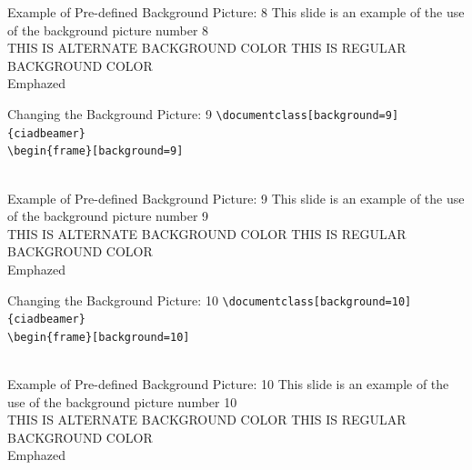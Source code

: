 \documentclass[english,sectioncirclenumberstyle]{ciadbeamer}
\begin{document}
\begin{frame}[background=8]{Example of Pre-defined Background Picture: 8}
	This slide is an example of the use of the background picture number 8 \\[.5cm]
	\ifbeamerthemeciadalternatebgcolor%
		THIS IS ALTERNATE BACKGROUND COLOR%
	\else%
		THIS IS REGULAR BACKGROUND COLOR%
	\fi\\[.5cm]%
	Emphazed 
\end{frame}

\begin{frame}[t]{{Changing the Background Picture:} 9}
	\texttt{{\textbackslash}documentclass[background=9]\{ciadbeamer\}} \\[.25cm]
	\texttt{{\textbackslash}begin\{frame\}[background=9]} \\[.25cm]
	\centering{} \\[.25cm]
\end{frame}

\begin{frame}[background=9]{Example of Pre-defined Background Picture: 9}
	This slide is an example of the use of the background picture number 9 \\[.5cm]
	\ifbeamerthemeciadalternatebgcolor%
		THIS IS ALTERNATE BACKGROUND COLOR%
	\else%
		THIS IS REGULAR BACKGROUND COLOR%
	\fi\\[.5cm]%
	Emphazed 
\end{frame}

\begin{frame}[t]{{Changing the Background Picture:} 10}
	\texttt{{\textbackslash}documentclass[background=10]\{ciadbeamer\}} \\[.25cm]
	\texttt{{\textbackslash}begin\{frame\}[background=10]} \\[.25cm]
	\centering{} \\[.25cm]
\end{frame}

\begin{frame}[background=10]{Example of Pre-defined Background Picture: 10}
	This slide is an example of the use of the background picture number 10 \\[.5cm]
	\ifbeamerthemeciadalternatebgcolor%
		THIS IS ALTERNATE BACKGROUND COLOR%
	\else%
		THIS IS REGULAR BACKGROUND COLOR%
	\fi\\[.5cm]%
	Emphazed 
\end{frame}
\end{document}
